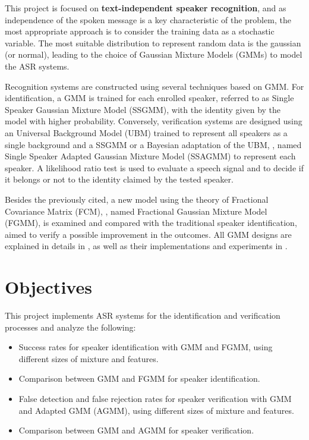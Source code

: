 This project is focused on \textbf{text-independent speaker recognition}, and as independence of the spoken message is a key characteristic of the problem, the most appropriate approach is to consider the training data as a stochastic variable. The most suitable distribution to represent random data is the gaussian (or normal), leading to the choice of Gaussian Mixture Models (GMMs) to model the ASR systems.

Recognition systems are constructed using several techniques based on GMM. For identification, a GMM is trained for each enrolled speaker, referred to as Single Speaker Gaussian Mixture Model (SSGMM), with the identity given by the model with higher probability. Conversely, verification systems are designed using an Universal Background Model (UBM) trained to represent all speakers as a single background and a SSGMM or a Bayesian adaptation of the UBM, , named Single Speaker Adapted Gaussian Mixture Model (SSAGMM) to represent each speaker. A likelihood ratio test is used to evaluate a speech signal and to decide if it belongs or not to the identity claimed by the tested speaker.

Besides the previously cited, a new model using the theory of Fractional Covariance Matrix (FCM), , named Fractional Gaussian Mixture Model (FGMM), is examined and compared with the traditional speaker identification, aimed to verify a possible improvement in the outcomes. All GMM designs are explained in details in , as well as their implementations and experiments in .

\section{Objectives}

This project implements ASR systems for the identification and verification processes and analyze the following:

\begin{itemize}\itemsep0pt
    \item Success rates for speaker identification with GMM and FGMM, using different sizes of mixture and features.
    \item Comparison between GMM and FGMM for speaker identification.
    \item False detection and false rejection rates for speaker verification with GMM and Adapted GMM (AGMM), using different sizes of mixture and features.
    \item Comparison between GMM and AGMM for speaker verification.
\end{itemize}

